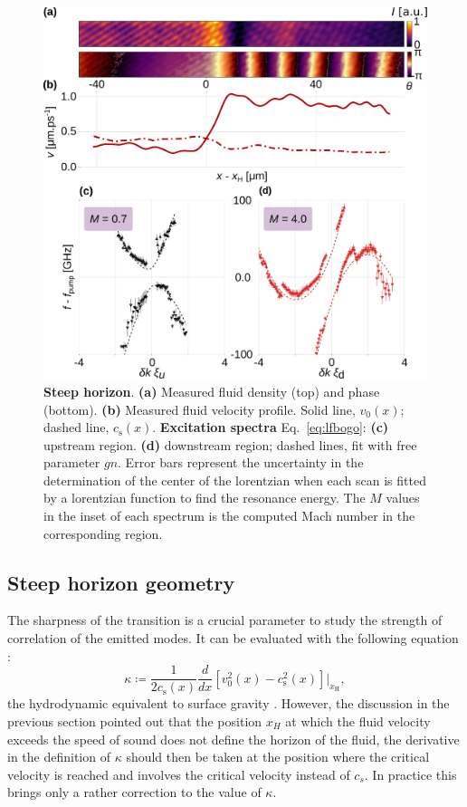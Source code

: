 \begin{figure}
    \centering
    \includegraphics[width=1\textwidth]{chap_custom_st/fig/bh_steep.pdf}
    \caption{\textbf{Steep horizon}.    
    \textbf{(a)} Measured fluid density (top) and phase (bottom).
    \textbf{(b)} Measured fluid velocity profile.
    Solid line, $v_0(x)$; dashed line, $c_\mathrm{s}(x)$.
    \textbf{Excitation spectra} Eq.~\eqref{eq:lfbogo}: \textbf{(c)} upstream region. \textbf{(d)} downstream region; dashed lines, fit with free parameter $gn$. Error bars represent the uncertainty in the determination
    of the center of the lorentzian when each scan is fitted by a lorentzian function to find the resonance energy. The $M$ values in the inset of each spectrum is the computed Mach number in the corresponding region. }
    \label{fig:bh_steep}
\end{figure}
\clearpage

\subsection{Steep horizon geometry}

The sharpness of the transition is a crucial parameter to study the strength of correlation of the emitted modes. It can be evaluated with the following equation :
\begin{equation}
    \kappa \coloneqq \frac{1}{2c_\mathrm{s}(x)}\frac{d}{dx}[v^2_0(x)-c^2_\mathrm{s}(x)]|_{x_\mathrm{H}},
    \label{eq:steepness}
\end{equation}
the hydrodynamic equivalent to surface gravity \cite{barcelo_hawking-like_2006}. However, the discussion in the previous section 
pointed out that the position $x_H$ at which the fluid velocity exceeds the speed of sound does not define the horizon of the fluid, the derivative
in the definition of $\kappa$ should then be taken at the position where the critical velocity is reached and involves the critical velocity instead of $c_s$.
In practice this brings only a rather correction to the value of $\kappa$. 

